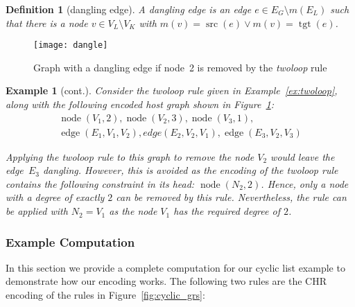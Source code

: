 \documentclass{tlp}
\newtheorem{example}{Example}[section]
\newtheorem{definition}{Definition}[section]
\DeclareMathOperator{\src}{src}
\DeclareMathOperator{\tgt}{tgt}
\DeclareMathOperator{\node}{node}
\DeclareMathOperator{\edge}{edge}
\begin{document}
\begin{definition}[dangling edge]A \emph{dangling edge} is an edge $e \in E_G 
\setminus m(E_L)$ such that there is a node $v \in V_L \setminus V_K$ with 
$m(v) = \src(e) \lor m(v) = \tgt(e)$.
\end{definition}

\begin{figure}
\texttt{[image: dangle]}
\caption{Graph with a dangling edge if node~2 is removed by the
\emph{twoloop} rule}
\label{fig:dangle}
\end{figure}

\begin{example}[cont.] Consider the \emph{twoloop} rule given in
Example~\ref{ex:twoloop}, along with the following encoded host graph shown in
Figure~\ref{fig:dangle}:
\[
\begin{array}{l}
\node(V_1, 2), \node(V_2, 3), \node(V_3,1),\\
\edge(E_1, V_1, V_2), edge(E_2, V_2, V_1), \edge(E_3, V_2, V_3)
\end{array}
\]

Applying the \emph{twoloop} rule to this graph to remove the node $V_2$ would
leave the edge~$E_3$ dangling. However, this is avoided as the encoding of the
\emph{twoloop} rule contains the following constraint in its head: $\node(N_2,
2)$. Hence, only a node with a degree of exactly $2$ can be removed by this rule.
Nevertheless, the rule can be applied with $N_2 = V_1$ as the node $V_1$ has the
required degree of $2$.
\end{example}

\subsubsection{Example Computation}
\label{sec:encoding_example}

In this section we provide a complete computation for our cyclic list example to
demonstrate how our encoding works. The following two rules are the CHR encoding
of the rules in Figure~\ref{fig:cyclic_grs}:
\end{document}
